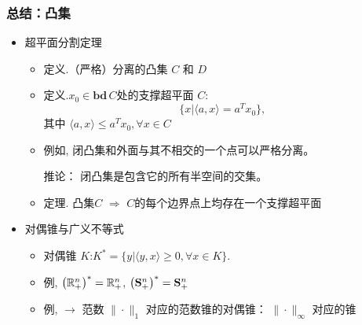 \documentclass[handout]{beamer}
\begin{document}
\begin{frame}
	\frametitle{总结：凸集 }

\begin{itemize}
\item 超平面分割定理

\begin{itemize}
  \item 定义.\mystar（严格）分离的凸集 $C$ 和 $D$

  \item 定义.\mystar $x_0 \in \mathbf{bd}\,C$处的支撑超平面 $C$: $$\{x|\langle a,x\rangle = a^T x_0\}, $$ 其中
      $\langle a,x\rangle \leq  a^T x_0, \forall x\in C
      $

\item 例如, 闭凸集和外面与其不相交的一个点可以严格分离。

  推论：    闭凸集是包含它的所有半空间的交集。

\item 定理. 凸集$C$ $\Rightarrow$   $C$的每个边界点上均存在一个支撑超平面



\end{itemize}

\item  对偶锥与广义不等式

\begin{itemize}
  \item 对偶锥 $K$:\mystar $K^* = \{ y | \langle y,x\rangle \geq 0, \forall x \in K\}$.

\item 例, $\left(\mathbb{R}^n_+\right)^* = \mathbb{R}^n_{+}$, $\left(\mathbf{S}^n_+\right)^* = \mathbf{S}^n_{+}$


\item 例,               $\rightarrow$  范数  $\|\cdot\|_1 $ 对应的范数锥的对偶锥：  $\|\cdot\|_{\infty}$ 对应的锥 \mystar
\end{itemize}


  \end{itemize}
\end{frame}
\end{document}
